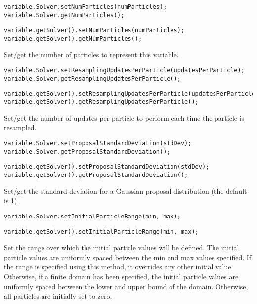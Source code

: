 \ifmatlab
\begin{lstlisting}
variable.Solver.setNumParticles(numParticles);
variable.Solver.getNumParticles();
\end{lstlisting}
\fi

\ifjava
\begin{lstlisting}
variable.getSolver().setNumParticles(numParticles);
variable.getSolver().getNumParticles();
\end{lstlisting}
\fi

Set/get the number of particles to represent this variable.

\ifmatlab
\begin{lstlisting}
variable.Solver.setResamplingUpdatesPerParticle(updatesPerParticle);
variable.Solver.getResamplingUpdatesPerParticle();
\end{lstlisting}
\fi

\ifjava
\begin{lstlisting}
variable.getSolver().setResamplingUpdatesPerParticle(updatesPerParticle);
variable.getSolver().getResamplingUpdatesPerParticle();
\end{lstlisting}
\fi


Set/get the number of updates per particle to perform each time the particle is resampled.

\ifmatlab
\begin{lstlisting}
variable.Solver.setProposalStandardDeviation(stdDev);
variable.Solver.getProposalStandardDeviation();
\end{lstlisting}
\fi

\ifjava
\begin{lstlisting}
variable.getSolver().setProposalStandardDeviation(stdDev);
variable.getSolver().getProposalStandardDeviation();
\end{lstlisting}
\fi


Set/get the standard deviation for a Gaussian proposal distribution (the default is 1).

\ifmatlab
\begin{lstlisting}
variable.Solver.setInitialParticleRange(min, max);
\end{lstlisting}
\fi

\ifjava
\begin{lstlisting}
variable.getSolver().setInitialParticleRange(min, max);
\end{lstlisting}
\fi

Set the range over which the initial particle values will be defined. The initial particle values are uniformly spaced between the min and max values specified. If the range is specified using this method, it overrides any other initial value. Otherwise, if a finite domain has been specified, the initial particle values are uniformly spaced between the lower and upper bound of the domain. Otherwise, all particles are initially set to zero.

